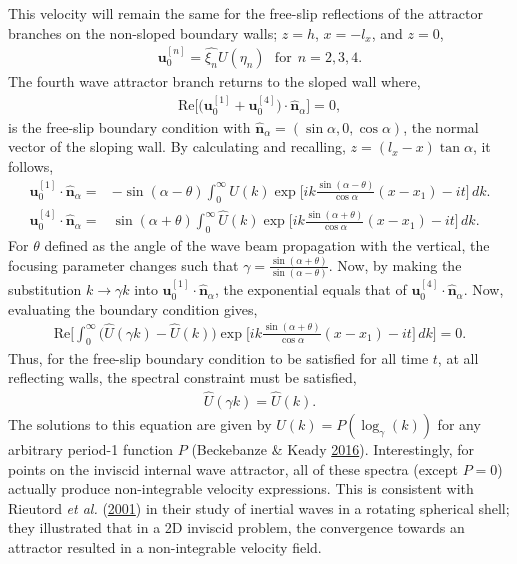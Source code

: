 \documentclass[a4paper]{article}
\numberwithin{equation}{section}
\begin{document}
This velocity will remain the same for the free-slip reflections of the attractor branches on the non-sloped boundary walls; $z=h$, $x=-l_x$, and $z=0$,
\begin{align}\label{eq:4.9}
\mathbf{u}_0^{[n]} = \hat{\xi_n}U(\eta_n) ~~~ \text{for} ~~n = 2, 3, 4.
\end{align}
The fourth wave attractor branch returns to the sloped wall where,
\begin{align}\label{eq:4.10}
\text{Re} \bigg[\bigg( \mathbf{u}_0^{[1]} + \mathbf{u}_0^{[4]}\bigg) \cdot \mathbf{\hat{n}}_\alpha \bigg] = 0,
\end{align}
is the free-slip boundary condition with $\mathbf{\hat{n}}_\alpha = (\sin\alpha, 0, \cos\alpha)$, the normal vector of the sloping wall. By calculating and recalling, $z = (l_x - x)\tan\alpha$, it follows,
\begin{equation*}
\begin{split}
\mathbf{u}_0^{[1]} \cdot \mathbf{\hat{n}}_\alpha =& - \sin(\alpha - \theta) \int_{0}^{\infty} \hat{U}(k) \exp \bigg[ ik\frac{\sin(\alpha - \theta)}{\cos\alpha}(x-x_1) - it\bigg] 
\,dk.\\
\mathbf{u}_0^{[4]} \cdot \mathbf{\hat{n}}_\alpha =& \sin(\alpha + \theta) \int_{0}^{\infty} \hat{U}(k) \exp \bigg[ ik\frac{\sin(\alpha + \theta)}{\cos\alpha}(x-x_1) - it\bigg] 
\,dk.
\end{split}
\end{equation*}
For $\theta$ defined as the angle of the wave beam propagation with the vertical, the focusing parameter changes such that $\gamma = \frac{\sin(\alpha + \theta)}{\sin(\alpha - \theta)}$. Now, by making the 
substitution $k \rightarrow \gamma k$ into $\mathbf{u}_0^{[1]} \cdot \mathbf{\hat{n}}_\alpha$, the exponential equals that of $\mathbf{u}_0^{[4]} \cdot \mathbf{\hat{n}}_\alpha$. Now, evaluating the boundary condition gives, 
\begin{align}\label{eq:4.11}
\text{Re} \bigg[\int_{0}^{\infty} \bigg( \hat{U}(\gamma k) - \hat{U}(k)\bigg) \exp \bigg[ ik\frac{\sin(\alpha + \theta)}{\cos\alpha}(x-x_1) - it\bigg]\,dk \bigg] = 0.
\end{align}
Thus, for the free-slip boundary condition to be satisfied for all time $t$, at all reflecting walls, the spectral constraint must be satisfied, 
\begin{align*}
\hat{U}(\gamma k) = \hat{U}(k).
\end{align*}
The solutions to this equation are given by $\hat{U}(k) = P(\log_\gamma(k))$ for any arbitrary period-1 function $P$ (Beckebanze \& Keady \hyperlink{ref 29}{2016}). Interestingly, for points on the inviscid internal wave attractor, all of these spectra (except $P=0$) actually produce non-integrable velocity expressions. This is consistent with Rieutord \emph{et al.} (\hyperlink{ref 12}{2001}) in their study of inertial waves in a rotating spherical shell; they illustrated that in a 2D inviscid problem, the convergence towards an attractor resulted in a non-integrable velocity field. 
\end{document}
